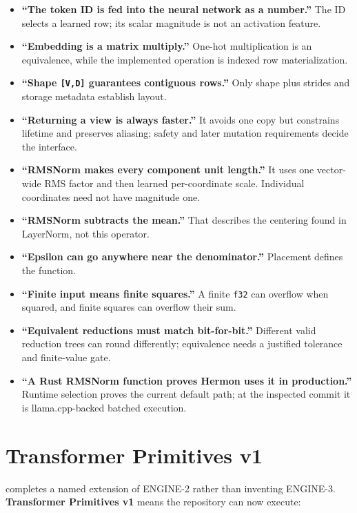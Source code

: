 \begin{itemize}
\tightlist
\item
  \textbf{``The token ID is fed into the neural network as a number.''}
  The ID selects a learned row; its scalar magnitude is not an
  activation feature.
\item
  \textbf{``Embedding is a matrix multiply.''} One-hot multiplication is
  an equivalence, while the implemented operation is indexed row
  materialization.
\item
  \textbf{``Shape \texttt{{[}V,D{]}} guarantees contiguous rows.''} Only
  shape plus strides and storage metadata establish layout.
\item
  \textbf{``Returning a view is always faster.''} It avoids one copy but
  constrains lifetime and preserves aliasing; safety and later mutation
  requirements decide the interface.
\item
  \textbf{``RMSNorm makes every component unit length.''} It uses one
  vector-wide RMS factor and then learned per-coordinate scale.
  Individual coordinates need not have magnitude one.
\item
  \textbf{``RMSNorm subtracts the mean.''} That describes the centering
  found in LayerNorm, not this operator.
\item
  \textbf{``Epsilon can go anywhere near the denominator.''} Placement
  defines the function.
\item
  \textbf{``Finite input means finite squares.''} A finite \texttt{f32}
  can overflow when squared, and finite squares can overflow their sum.
\item
  \textbf{``Equivalent reductions must match bit-for-bit.''} Different
  valid reduction trees can round differently; equivalence needs a
  justified tolerance and finite-value gate.
\item
  \textbf{``A Rust RMSNorm function proves Hermon uses it in
  production.''} Runtime selection proves the current default path; at
  the inspected commit it is llama.cpp-backed batched execution.
\end{itemize}

\section{Transformer Primitives v1}\label{transformer-primitives-v1}

 completes a named extension of ENGINE-2 rather than inventing
ENGINE-3. \textbf{Transformer Primitives v1} means the repository can
now execute:

